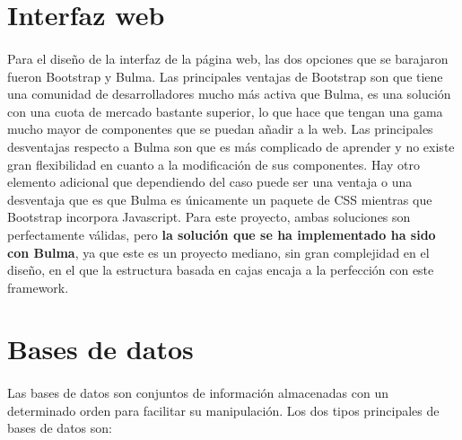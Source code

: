 \section{Interfaz web}
\paragraph{}
Para el diseño de la interfaz de la página web, las dos opciones que se barajaron fueron Bootstrap y Bulma. Las principales ventajas de Bootstrap son que tiene una comunidad de desarrolladores mucho más activa que Bulma, es una solución con una cuota de mercado bastante superior, lo que hace que tengan una gama mucho mayor de componentes que se puedan añadir a la web. Las principales desventajas respecto a Bulma son que es más complicado de aprender y no existe gran flexibilidad en cuanto a la modificación de sus componentes. Hay otro elemento adicional que dependiendo del caso puede ser una ventaja o una desventaja que es que Bulma es únicamente un paquete de CSS mientras que Bootstrap incorpora Javascript. Para este proyecto, ambas soluciones son perfectamente válidas, pero \textbf{la solución que se ha implementado ha sido con Bulma}, ya que este es un proyecto mediano, sin gran complejidad en el diseño, en el que la estructura basada en cajas encaja a la perfección con este framework.

\section{Bases de datos}
\label{sec:tipoBD}
\paragraph{}
Las bases de datos son conjuntos de información almacenadas con un determinado orden para facilitar su manipulación. Los dos tipos principales de bases de datos son:

